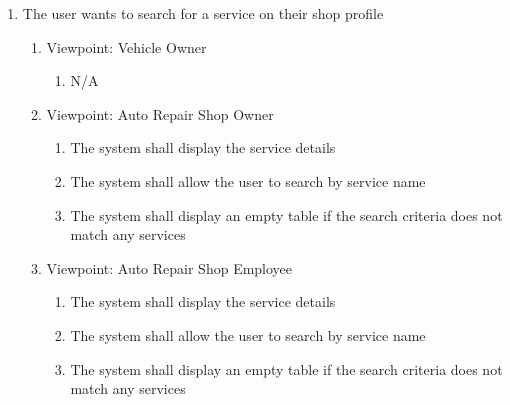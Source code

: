 \documentclass[12pt]{article}
\begin{document}
\begin{enumerate}[resume*=business_events]
	\item The user wants to search for a service on their shop profile
	      \begin{enumerate}[VP\arabic*.]
		      \item Viewpoint: Vehicle Owner
		            \begin{enumerate}
			            \item[] N/A
		            \end{enumerate}
		      \item Viewpoint: Auto Repair Shop Owner
		            \begin{enumerate}
			            \item The system shall display the service details
			            \item The system shall allow the user to search by service name
			            \item The system shall display an empty table if the search criteria does not match any services
		            \end{enumerate}
		      \item Viewpoint: Auto Repair Shop Employee
		            \begin{enumerate}
			            \item The system shall display the service details
			            \item The system shall allow the user to search by service name
			            \item The system shall display an empty table if the search criteria does not match any services
		            \end{enumerate}
	      \end{enumerate}


\end{enumerate}
\end{document}
